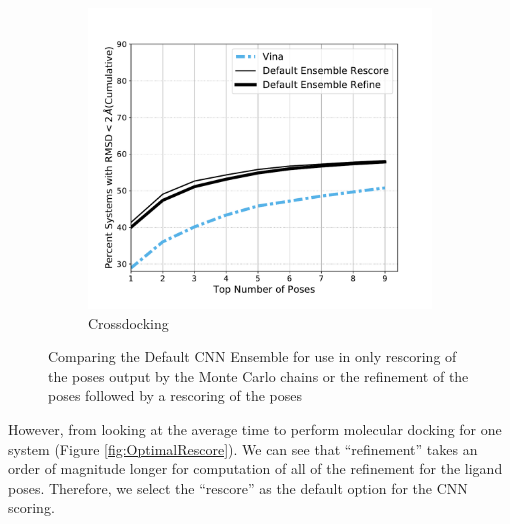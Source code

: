 \documentclass[journal=jcisd8,manuscript=article]{achemso}
\begin{document}
\begin{figure}
\begin{subfigure}[b]{0.48\textwidth}
		\includegraphics[width=\textwidth]{figures/crossdocking/rescore_vs_refine_line.pdf} 
		\caption{Crossdocking}
		\label{fig:CompareRescoreRefineCrossdock}
        \end{subfigure}    
	\caption{Comparing the Default CNN Ensemble for use in only rescoring of the poses output by the Monte Carlo chains or the refinement of the poses followed by a rescoring of the poses}
	\label{fig:CompareRescoreRefine}
\end{figure}    

However, from looking at the average time to perform molecular docking for one system (Figure \ref{fig:OptimalRescore}). We can see that ``refinement'' takes an order of magnitude longer for computation of all of the refinement for the ligand poses. Therefore, we select the ``rescore'' as the default option for the CNN scoring.
\end{document}

